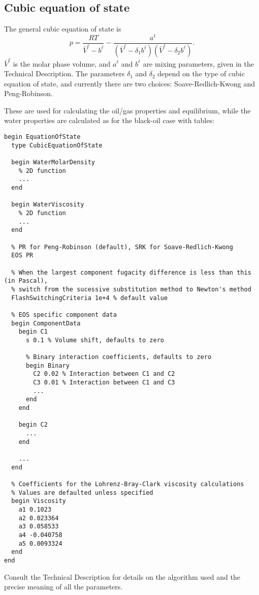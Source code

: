 
\subsection{Cubic equation of state}

The general cubic equation of state is
\begin{equation}
  p = \frac{RT}{\bar V^\ell - b^\ell} - \frac{a^\ell}
  {\left(\bar V^\ell - \delta_1 b^\ell\right)
    \left(\bar V^\ell - \delta_2 b^\ell\right)}.
\end{equation}
$\bar V^\ell$ is the molar phase volume, and $a^\ell$ and $b^\ell$ are
mixing parameters, given in the Technical Description. The parameters
$\delta_1$ and $\delta_2$ depend on the type of cubic equation of
state, and currently there are two choices: Soave-Redlich-Kwong and
Peng-Robinson.

These are used for calculating the oil/gas properties and equilibrium,
while the water properties are calculated as for the black-oil case
with tables:

\begin{verbatim}
begin EquationOfState
  type CubicEquationOfState

  begin WaterMolarDensity
    % 2D function
    ...
  end

  begin WaterViscosity
    % 2D function
    ...
  end

  % PR for Peng-Robinson (default), SRK for Soave-Redlich-Kwong
  EOS PR

  % When the largest component fugacity difference is less than this (in Pascal),
  % switch from the sucessive substitution method to Newton's method
  FlashSwitchingCriteria 1e+4 % default value

  % EOS specific component data
  begin ComponentData
    begin C1
      s 0.1 % Volume shift, defaults to zero

      % Binary interaction coefficients, defaults to zero
      begin Binary
        C2 0.02 % Interaction between C1 and C2
        C3 0.01 % Interaction between C1 and C3
        ...
      end
    end

    begin C2
      ...
    end

    ...
  end

  % Coefficients for the Lohrenz-Bray-Clark viscosity calculations
  % Values are defaulted unless specified
  begin Viscosity
    a1 0.1023
    a2 0.023364
    a3 0.058533
    a4 -0.040758
    a5 0.0093324
  end
end
\end{verbatim}
Consult the Technical Description for details on the algorithm used
and the precise meaning of all the parameters.

